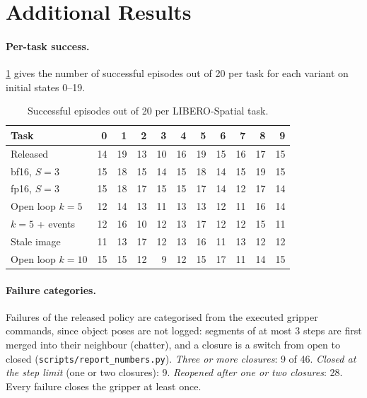 \section{Additional Results}
\label{app:results}

\paragraph{Per-task success.}
\cref{tab:pertask} gives the number of successful episodes out of 20 per task for each variant on initial states 0--19.

\begin{table}[ht]
\centering\small
\setlength{\tabcolsep}{3.2pt}
\begin{tabular}{@{}lrrrrrrrrrr@{}}
\toprule
Task & 0 & 1 & 2 & 3 & 4 & 5 & 6 & 7 & 8 & 9 \\
\midrule
Released & 14 & 19 & 13 & 10 & 16 & 19 & 15 & 16 & 17 & 15 \\
bf16, $S{=}3$ & 15 & 18 & 15 & 14 & 15 & 18 & 14 & 15 & 19 & 15 \\
fp16, $S{=}3$ & 15 & 18 & 17 & 15 & 15 & 17 & 14 & 12 & 17 & 14 \\
Open loop $k{=}5$ & 12 & 14 & 13 & 11 & 13 & 13 & 12 & 11 & 16 & 14 \\
$k{=}5$ + events & 12 & 16 & 10 & 12 & 13 & 17 & 12 & 12 & 15 & 11 \\
Stale image & 11 & 13 & 17 & 12 & 13 & 16 & 11 & 13 & 12 & 12 \\
Open loop $k{=}10$ & 15 & 15 & 12 & 9 & 12 & 15 & 17 & 11 & 14 & 15 \\
\bottomrule
\end{tabular}
\caption{Successful episodes out of 20 per LIBERO-Spatial task.}
\label{tab:pertask}
\end{table}

\paragraph{Failure categories.}
Failures of the released policy are categorised from the executed gripper commands, since object poses are not logged: segments of at most 3 steps are first merged into their neighbour (chatter), and a closure is a switch from open to closed (\texttt{scripts/report\_numbers.py}).
\emph{Three or more closures}: 9 of 46.
\emph{Closed at the step limit} (one or two closures): 9.
\emph{Reopened after one or two closures}: 28.
Every failure closes the gripper at least once.

